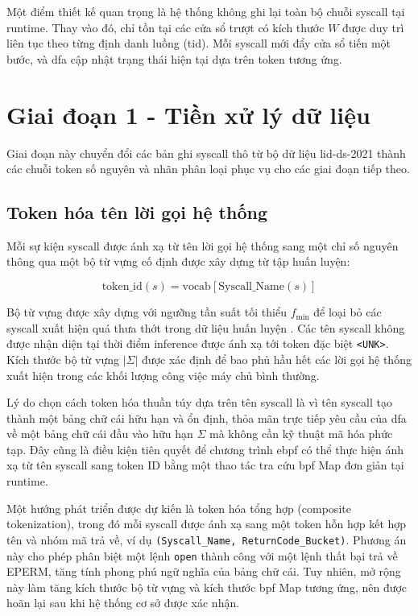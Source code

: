 \documentclass[../main.tex]{subfiles}
\begin{document}
Một điểm thiết kế quan trọng là hệ thống không ghi lại toàn
bộ chuỗi \gls{syscall}
tại runtime. Thay vào đó, chỉ tồn tại các cửa sổ trượt có kích thước
$W$ được duy trì liên tục theo từng định danh luồng (\gls{tid}). Mỗi
\gls{syscall} mới đẩy cửa sổ
tiến một bước, và \gls{dfa} cập nhật trạng thái hiện tại dựa trên
token tương ứng.

\section{Giai đoạn 1 - Tiền xử lý dữ liệu}
\label{sec:phase1}

Giai đoạn này chuyển đổi các bản ghi \gls{syscall} thô từ bộ dữ liệu
\gls{lid-ds}-2021
\cite{grimmer2022dataset} thành các chuỗi token số nguyên và nhãn
phân loại phục vụ
cho các giai đoạn tiếp theo.

\subsection{Token hóa tên lời gọi hệ thống}
\label{sec:tokenization}

Mỗi sự kiện \gls{syscall} được ánh xạ từ tên lời gọi hệ thống sang một chỉ
số nguyên thông
qua một bộ từ vựng cố định được xây dựng từ tập huấn luyện:

\begin{equation}
  \label{eq:tokenization}
  \text{token\_id}(s) = \text{vocab}[\text{Syscall\_Name}(s)]
\end{equation}

Bộ từ vựng được xây dựng với ngưỡng tần suất tối thiểu
$f_{\text{min}}$ để loại bỏ các \gls{syscall} xuất hiện
quá thưa thớt trong dữ liệu huấn luyện \cite{mvula2023evaluating}.
Các tên \gls{syscall} không
được nhận diện tại thời điểm inference được ánh xạ tới token đặc biệt
\texttt{<UNK>}.
Kích thước bộ từ vựng $|\Sigma|$ được xác định để bao phủ hầu hết các lời
gọi hệ thống xuất hiện trong các khối lượng công việc máy chủ bình thường.

Lý do chọn cách token hóa thuần túy dựa trên tên \gls{syscall} là vì tên
\gls{syscall} tạo thành một
bảng chữ cái hữu hạn và ổn định, thỏa mãn trực tiếp yêu cầu của \gls{dfa}
về một bảng chữ cái
đầu vào hữu hạn $\Sigma$ mà không cần kỹ thuật mã hóa phức tạp. Đây
cũng là điều kiện
tiên quyết để chương trình \gls{ebpf} có thể thực hiện ánh xạ từ tên
\gls{syscall} sang token ID bằng
một thao tác tra cứu \gls{bpf} Map đơn giản tại runtime.

Một hướng phát triển được dự kiến là token hóa tổng hợp (composite
tokenization), trong
đó mỗi \gls{syscall} được ánh xạ sang một token hỗn hợp kết hợp tên và nhóm
mã trả về, ví dụ
\texttt{(Syscall\_Name, ReturnCode\_Bucket)}. Phương án này cho phép
phân biệt một lệnh
\texttt{open} thành công với một lệnh thất bại trả về EPERM, tăng
tính phong phú ngữ
nghĩa của bảng chữ cái. Tuy nhiên, mở rộng này làm tăng kích thước bộ
từ vựng và kích
thước \gls{bpf} Map tương ứng, nên được hoãn lại sau khi hệ thống cơ
sở được xác nhận.
\end{document}
